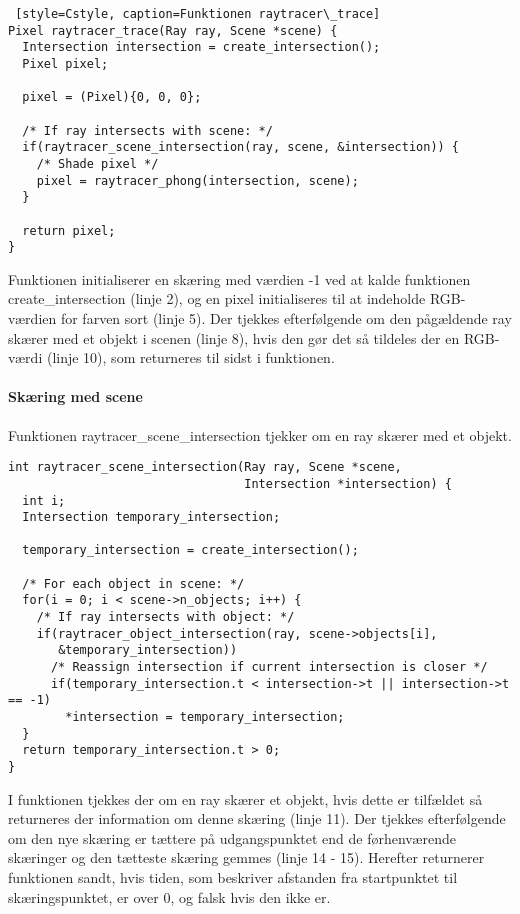 \begin{lstlisting} [style=Cstyle, caption=Funktionen raytracer\_trace]
Pixel raytracer_trace(Ray ray, Scene *scene) {
  Intersection intersection = create_intersection();
  Pixel pixel; 
  
  pixel = (Pixel){0, 0, 0};
  
  /* If ray intersects with scene: */
  if(raytracer_scene_intersection(ray, scene, &intersection)) {
    /* Shade pixel */
    pixel = raytracer_phong(intersection, scene);
  }
  
  return pixel;
}

\end{lstlisting}
Funktionen initialiserer en skæring med værdien -1 ved at kalde funktionen create\_intersection (linje 2), og en pixel initialiseres til at indeholde RGB-værdien for farven sort (linje 5). Der tjekkes efterfølgende om den pågældende ray skærer med et objekt i scenen (linje 8), hvis den gør det så tildeles der en RGB-værdi (linje 10), som returneres til sidst i funktionen. 

\paragraph{Skæring med scene}

Funktionen raytracer\_scene\_intersection tjekker om en ray skærer med et objekt.

\begin{lstlisting}[style=Cstyle, caption=Funktionen raytracer\_scene\_intersection]
int raytracer_scene_intersection(Ray ray, Scene *scene, 
                                 Intersection *intersection) {
  int i;
  Intersection temporary_intersection;

  temporary_intersection = create_intersection();

  /* For each object in scene: */
  for(i = 0; i < scene->n_objects; i++) {
    /* If ray intersects with object: */
    if(raytracer_object_intersection(ray, scene->objects[i], 
       &temporary_intersection))
      /* Reassign intersection if current intersection is closer */
      if(temporary_intersection.t < intersection->t || intersection->t == -1)
        *intersection = temporary_intersection;
  }
  return temporary_intersection.t > 0;
}
\end{lstlisting}

I funktionen tjekkes der om en ray skærer et objekt, hvis dette er tilfældet så returneres der information om denne skæring (linje 11). Der tjekkes efterfølgende om den nye skæring er tættere på udgangspunktet end de førhenværende skæringer og den tætteste skæring gemmes (linje 14 - 15). Herefter returnerer funktionen sandt, hvis tiden, som beskriver afstanden fra startpunktet  til skæringspunktet, er over 0, og falsk hvis den ikke er.



